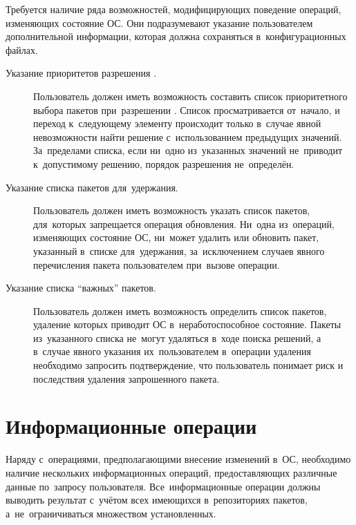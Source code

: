 Требуется наличие ряда возможностей, модифицирующих поведение операций, изменяющих состояние ОС.
Они подразумевают указание пользователем дополнительной информации,
которая должна сохраняться в~конфигурационных файлах. 

\begin{description}

\item[Указание приоритетов разрешения .]
Пользователь должен иметь возможность составить список приоритетного выбора пакетов при~разрешении .
Список просматривается от~начало, и переход к~следующему элементу происходит только в~случае явной невозможности найти решение с~использованием предыдущих значений.
За~пределами списка, если ни~одно из~указанных значений не~приводит к~допустимому решению,
порядок разрешения  не~определён.

\item[Указание списка пакетов для~удержания.]
Пользователь должен иметь возможность указать список пакетов, для~которых запрещается операция обновления.
Ни~одна из~операций, изменяющих состояние ОС, ни~может удалить или обновить пакет, указанный в~списке для~удержания,
за~исключением случаев явного перечисления пакета пользователем при~вызове операции.

\item[Указание списка ``важных'' пакетов.]
Пользователь должен иметь возможность определить список пакетов, 
удаление которых приводит ОС в~неработоспособное состояние.
Пакеты из~указанного списка не~могут удаляться в~ходе поиска решений, а в~случае явного указания их~пользователем в~операции удаления
необходимо запросить подтверждение, что пользователь понимает риск и последствия удаления запрошенного пакета.

\end{description}

\section{Информационные операции}

Наряду с~операциями, предполагающими внесение изменений в~ОС,
необходимо наличие нескольких информационных операций,
предоставляющих различные данные по~запросу пользователя.
Все~информационные операции должны выводить результат с~учётом всех имеющихся в~репозиториях пакетов,
а~не~ограничиваться множеством установленных.

